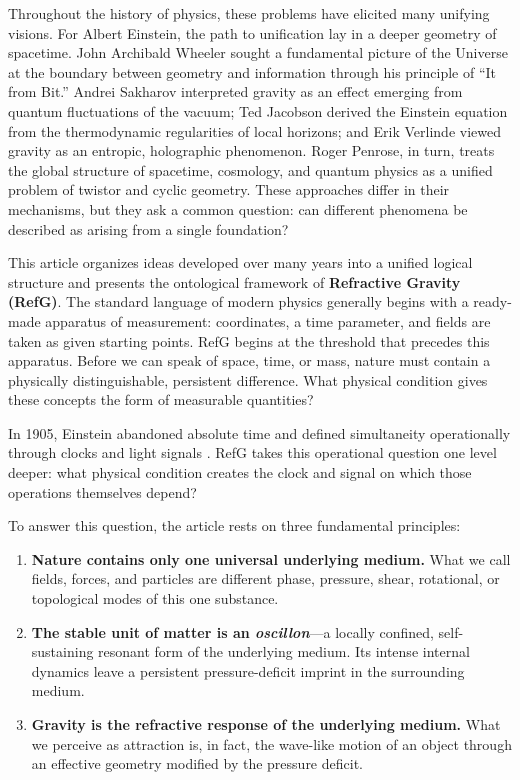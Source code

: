 \documentclass[11pt,a4paper]{article}
\begin{document}
Throughout the history of physics, these problems have elicited many unifying visions. For Albert Einstein, the path to unification lay in a deeper geometry of spacetime. John Archibald Wheeler sought a fundamental picture of the Universe at the boundary between geometry and information through his principle of ``It from Bit.'' Andrei Sakharov interpreted gravity as an effect emerging from quantum fluctuations of the vacuum; Ted Jacobson derived the Einstein equation from the thermodynamic regularities of local horizons; and Erik Verlinde viewed gravity as an entropic, holographic phenomenon. Roger Penrose, in turn, treats the global structure of spacetime, cosmology, and quantum physics as a unified problem of twistor and cyclic geometry. These approaches differ in their mechanisms, but they ask a common question: can different phenomena be described as arising from a single foundation?

This article organizes ideas developed over many years into a unified logical structure and presents the ontological framework of \textbf{Refractive Gravity (RefG)}. The standard language of modern physics generally begins with a ready-made apparatus of measurement: coordinates, a time parameter, and fields are taken as given starting points. RefG begins at the threshold that precedes this apparatus. Before we can speak of space, time, or mass, nature must contain a physically distinguishable, persistent difference. What physical condition gives these concepts the form of measurable quantities?

In 1905, Einstein abandoned absolute time and defined simultaneity operationally through clocks and light signals \citep{einstein1905}. RefG takes this operational question one level deeper: what physical condition creates the clock and signal on which those operations themselves depend?

To answer this question, the article rests on three fundamental principles:

\begin{enumerate}[label=\textbf{\arabic*.}]
\item \textbf{Nature contains only one universal underlying medium.} What we call fields, forces, and particles are different phase, pressure, shear, rotational, or topological modes of this one substance.

\item \textbf{The stable unit of matter is an \emph{oscillon}}---a locally confined, self-sustaining resonant form of the underlying medium. Its intense internal dynamics leave a persistent pressure-deficit imprint in the surrounding medium.

\item \textbf{Gravity is the refractive response of the underlying medium.} What we perceive as attraction is, in fact, the wave-like motion of an object through an effective geometry modified by the pressure deficit.
\end{enumerate}
\end{document}
